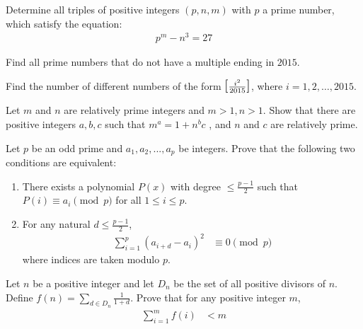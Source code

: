 \documentclass[problems.tex]{subfile}
\begin{document}
	\begin{problem}[Chile 2016]
		Determine all triples of positive integers $(p, n, m)$ with $p$ a prime number, which satisfy the equation:
		\begin{align*}
			p^m - n^3 = 27
		\end{align*}
	\end{problem}

	\begin{problem}
		Find all prime numbers that do not have a multiple ending in $2015$.
	\end{problem}

	\begin{problem}[Chile 2016]
		Find the number of different numbers of the form $\floor{\frac{i^2}{2015}}$, where $i=1,2,\dots,2015$.
	\end{problem}

	\begin{problem}
		Let $m$ and $n$ are relatively prime integers and $m>1,n>1$. Show that there are positive integers $a,b,c$ such that $m^a=1+n^bc$ , and $n$ and $c$ are relatively prime. %
	\end{problem}

	\begin{problem}
		Let $p$ be an odd prime and $a_1, a_2,...,a_p$ be integers. Prove that the following two conditions are equivalent:
		\begin{enumerate}
			\item There exists a polynomial $P(x)$ with degree $\leq \frac{p-1}{2}$ such that $P(i) \equiv a_i \pmod p$ for all $1 \leq i \leq p$.
			\item For any natural $d \leq \frac{p-1}{2}$,
				\begin{align*}
					\sum_{i=1}^p (a_{i+d} - a_i )^2
						& \equiv 0 \pmod p
				\end{align*}
			where indices are taken modulo $p$.
		\end{enumerate}
	\end{problem}

	\begin{problem}
		Let $n$ be a positive integer and let $D_n$ be the set of all positive divisors of $n$. Define $f(n)=\sum\limits_{d\in D_n}{\frac{1}{1+d}}$.
		Prove that for any positive integer $m$,
			\begin{align*}
				\sum_{i=1}^{m}{f(i)}
					& <m
			\end{align*}
	\end{problem}
\end{document}
